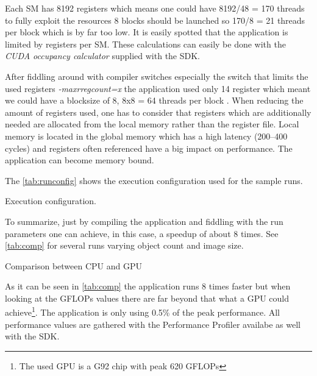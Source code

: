 Each \gls{SM} has 8192 registers which means one could have 8192/48 = 170 threads
to fully exploit the resources 8 blocks should be launched so 170/8 = 21 threads
per block which is by far too low. It is easily spotted that the application is
limited by registers per \gls{SM}. These calculations can easily be done with the
\emph{CUDA occupancy calculator} supplied with the SDK.

After fiddling around with compiler switches especially the switch that limits
the used registers \emph{-maxrregcount=x}
the application used only 14 register which meant we could have a blocksize of
8, 8x8 = 64 threads per block . When reducing the amount of registers used, one
has to consider that registers which are additionally needed are allocated from
the local memory rather than the register file. Local memory is located in the
global memory which has a high latency (200--400 cycles) and registers often
referenced have a big impact on performance. The application can become memory
bound.

The \autoref{tab:runconfig} shows the execution configuration used for the sample runs. 

\begin{table}[ht]
	\centering
  	\caption[Execution configuration]{Execution configuration.}	
	\label{tab:runconfig}
\end{table}



To summarize, just by compiling the application and fiddling with the run
parameters one can achieve, in this case, a speedup of about 8 times. See
\autoref{tab:comp} for several runs varying object count and image size.

\begin{table}[ht]
	\centering
	\caption{Comparison between \protect\gls{CPU} and \protect\gls{GPU}}
	\label{tab:comp}
\end{table}
	
	
As it can be seen in \autoref{tab:comp} the application runs 8 times faster but
when looking at the \glspl{GFLOP} values there are far beyond that what a
\gls{GPU} could achieve\footnote{The used \gls{GPU} is a G92 chip with peak 620
\glspl{GFLOP}}. The application is only using 0.5\% of the peak performance. All
performance values are gathered with the {} Performance
Profiler availabe as well with the \gls{SDK}.

